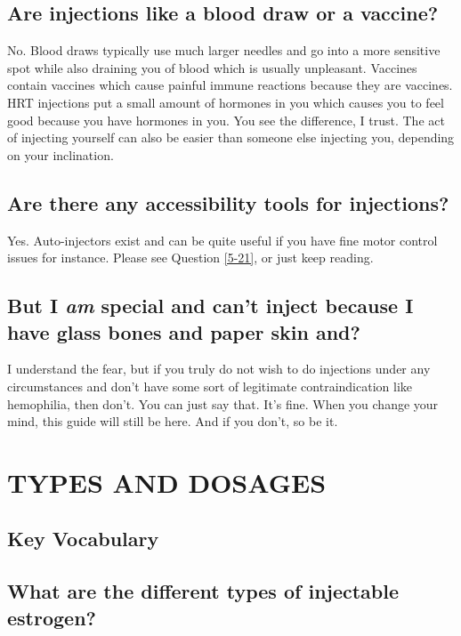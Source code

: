 \documentclass{article}
\begin{document}
\subsection{Are injections like a blood draw or a vaccine?}

No. Blood draws typically use much larger needles and go into a more sensitive spot while also draining you of blood which is usually unpleasant. Vaccines contain vaccines which cause painful immune reactions because they are vaccines. HRT injections put a small amount of hormones in you which causes you to feel good because you have hormones in you. You see the difference, I trust. The act of injecting yourself can also be easier than someone else injecting you, depending on your inclination.

\subsection{Are there any accessibility tools for injections?}

Yes. Auto-injectors exist and can be quite useful if you have fine motor control issues for instance. Please see Question \ref{5-21}, or just keep reading.

\subsection{But I \textit{am} special and can’t inject because I have glass bones and paper skin and\textemdash{}?}

I understand the fear, but if you truly do not wish to do injections under any circumstances and don’t have some sort of legitimate contraindication like hemophilia, then don’t. You can just say that. It’s fine. When you change your mind, this guide will still be here. And if you don’t, so be it.



\section{TYPES AND DOSAGES}\label{td}

\subsection*{Key Vocabulary}

\subsection{What are the different types of injectable estrogen?}
\end{document}
